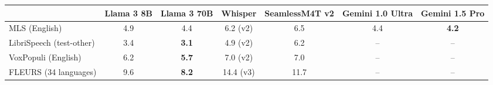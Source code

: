 \begin{NiceTabular}{lcccccc}
	\CodeBefore
	\Body
	\toprule
	& \textbf{Llama 3 8B} & \textbf{Llama 3 70B} & \textbf{Whisper} & \textbf{SeamlessM4T v2} & \textbf{Gemini 1.0 Ultra} & \textbf{Gemini 1.5 Pro}\\
	\midrule
	MLS \scriptsize{(English)} & 4.9 & 4.4 & 6.2 \scriptsize{(v2)} & 6.5 & 4.4 & \textbf{4.2} \\
	LibriSpeech \scriptsize{(test-other)} & 3.4 & \textbf{3.1} & 4.9 \scriptsize{(v2)} & 6.2 & -- &  -- \\
	VoxPopuli \scriptsize{(English)}  & 6.2 & \textbf{5.7} &  7.0  \scriptsize{(v2)} & 7.0 & -- & --  \\
	FLEURS \scriptsize{(34 languages)} & 9.6 & \textbf{8.2} & 14.4 \scriptsize{(v3)}  & 11.7 & -- & -- \\
	\bottomrule
\end{NiceTabular}
